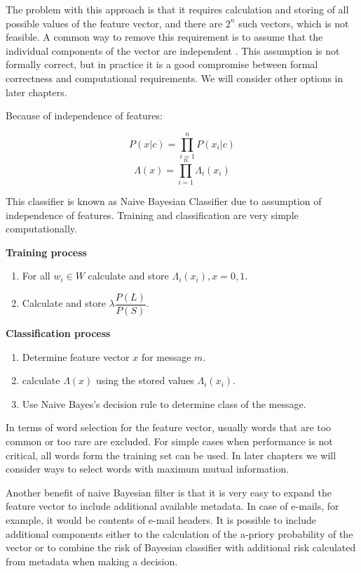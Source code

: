 \documentclass[12pt]{report}
\begin{document}
The problem with this approach is that it requires calculation and storing of all possible values of the feature vector, and there are $2^n$ such vectors, which is not feasible. A common way to remove this requirement is to assume that the individual components of the vector are independent \cite{Tretyakov}. This assumption is not formally correct, but in practice it is a good compromise between formal correctness and computational requirements. We will consider other options in later chapters.

Because of independence of features:

$$P(x | c) = \prod_{i=1}^{n}P(x_i | c)$$
$$\Lambda(x) = \prod_{i=1}^{n}\Lambda_i(x_i)$$

This classifier is known as Naive Bayesian Classifier due to assumption of independence of features. Training and classification are very simple computationally.

\textbf{Training process}

\begin{enumerate}
	\item For all $w_i \in W$ calculate and store $\Lambda_i(x_i), x = 0, 1$.
	\item Calculate and store $\lambda \dfrac{P(L)}{P(S)}$.
\end{enumerate}

\textbf{Classification process}

\begin{enumerate}
	\item Determine feature vector $x$ for message $m$.
	\item calculate $\Lambda(x)$ using the stored values $\Lambda_i(x_i)$.
	\item Use Naive Bayes's decision rule to determine class of the message.
\end{enumerate}

In terms of word selection for the feature vector, usually words that are too common or too rare are excluded. For simple cases when performance is not critical, all words form the training set can be used. In later chapters we will consider ways to select words with maximum mutual information.

Another benefit of naive Bayesian filter is that it is very easy to expand the feature vector to include additional available metadata. In case of e-mails, for example, it would be contents of e-mail headers. It is possible to include additional components either to the calculation of the a-priory probability of the vector or to combine the risk of Bayesian classifier with additional risk calculated from metadata when making a decision.
\end{document}

